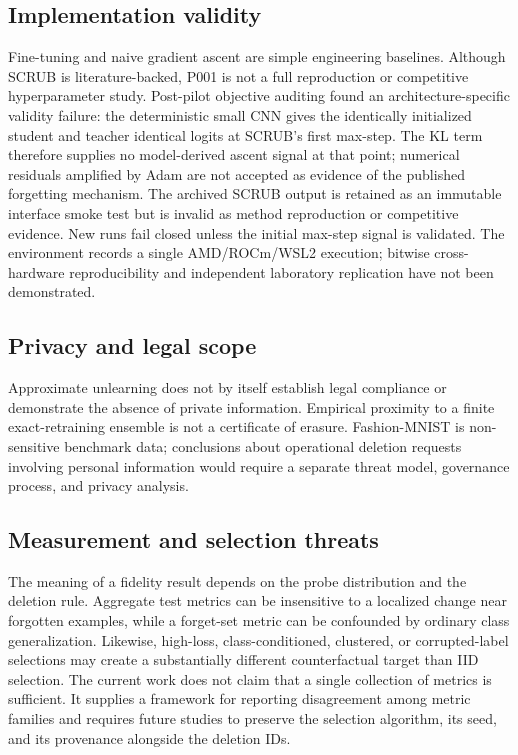\subsection{Implementation validity}
Fine-tuning and naive gradient ascent are simple engineering baselines. Although SCRUB is
literature-backed, P001 is not a full reproduction or competitive hyperparameter study.
Post-pilot objective auditing found an architecture-specific validity failure: the deterministic
small CNN gives the identically initialized student and teacher identical logits at SCRUB's first
max-step. The KL term therefore supplies no model-derived ascent signal at that point; numerical
residuals amplified by Adam are not accepted as evidence of the published forgetting mechanism.
The archived SCRUB output is retained as an immutable interface smoke test but is invalid as method
reproduction or competitive evidence. New runs fail closed unless the initial max-step signal is
validated.
The environment records a single AMD/ROCm/WSL2 execution; bitwise cross-hardware
reproducibility and independent laboratory replication have not been demonstrated.

\subsection{Privacy and legal scope}
Approximate unlearning does not by itself establish legal compliance or demonstrate the
absence of private information. Empirical proximity to a finite exact-retraining ensemble
is not a certificate of erasure. Fashion-MNIST is non-sensitive benchmark data; conclusions
about operational deletion requests involving personal information would require a
separate threat model, governance process, and privacy analysis.

\subsection{Measurement and selection threats}
The meaning of a fidelity result depends on the probe distribution and the deletion rule.
Aggregate test metrics can be insensitive to a localized change near forgotten examples,
while a forget-set metric can be confounded by ordinary class generalization. Likewise,
high-loss, class-conditioned, clustered, or corrupted-label selections may create a
substantially different counterfactual target than IID selection. The current work does not
claim that a single collection of metrics is sufficient. It supplies a framework for
reporting disagreement among metric families and requires future studies to preserve the
selection algorithm, its seed, and its provenance alongside the deletion IDs.

